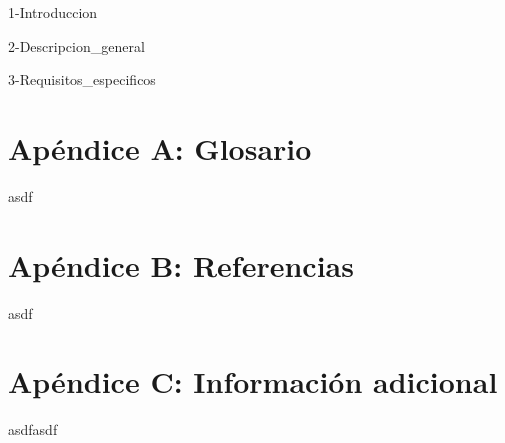 
{1-Introduccion}

{2-Descripcion_general}

{3-Requisitos_especificos}

\section{Apéndice A: Glosario}
asdf
\section{Apéndice B: Referencias}
asdf
\section{Apéndice C: Información adicional}
asdfasdf
